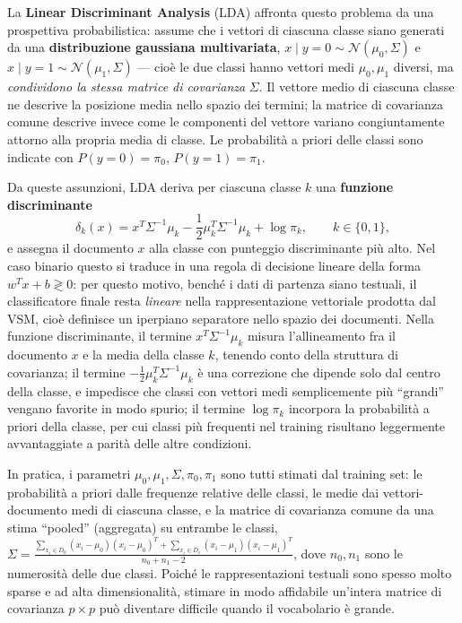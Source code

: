 \documentclass[11pt,a4paper]{report}
\begin{document}
La \textbf{Linear Discriminant Analysis} (LDA) affronta questo problema da una prospettiva probabilistica: assume che i vettori di ciascuna classe siano generati da una \textbf{distribuzione gaussiana multivariata}, $x \mid y{=}0 \sim \mathcal{N}(\mu_0,\Sigma)$ e $x \mid y{=}1 \sim \mathcal{N}(\mu_1,\Sigma)$ --- cioè le due classi hanno vettori medi $\mu_0,\mu_1$ diversi, ma \emph{condividono la stessa matrice di covarianza} $\Sigma$. Il vettore medio di ciascuna classe ne descrive la posizione media nello spazio dei termini; la matrice di covarianza comune descrive invece come le componenti del vettore variano congiuntamente attorno alla propria media di classe. Le probabilità a priori delle classi sono indicate con $P(y{=}0)=\pi_0$, $P(y{=}1)=\pi_1$.

Da queste assunzioni, LDA deriva per ciascuna classe $k$ una \textbf{funzione discriminante}
\[
\delta_k(x) = x^T \Sigma^{-1}\mu_k - \frac{1}{2}\mu_k^T\Sigma^{-1}\mu_k + \log \pi_k, \qquad k \in \{0,1\},
\]
e assegna il documento $x$ alla classe con punteggio discriminante più alto. Nel caso binario questo si traduce in una regola di decisione lineare della forma $w^Tx + b \gtrless 0$: per questo motivo, benché i dati di partenza siano testuali, il classificatore finale resta \emph{lineare} nella rappresentazione vettoriale prodotta dal VSM, cioè definisce un iperpiano separatore nello spazio dei documenti. Nella funzione discriminante, il termine $x^T\Sigma^{-1}\mu_k$ misura l'allineamento fra il documento $x$ e la media della classe $k$, tenendo conto della struttura di covarianza; il termine $-\frac{1}{2}\mu_k^T\Sigma^{-1}\mu_k$ è una correzione che dipende solo dal centro della classe, e impedisce che classi con vettori medi semplicemente più ``grandi'' vengano favorite in modo spurio; il termine $\log\pi_k$ incorpora la probabilità a priori della classe, per cui classi più frequenti nel training risultano leggermente avvantaggiate a parità delle altre condizioni.

In pratica, i parametri $\mu_0,\mu_1,\Sigma,\pi_0,\pi_1$ sono tutti stimati dal training set: le probabilità a priori dalle frequenze relative delle classi, le medie dai vettori-documento medi di ciascuna classe, e la matrice di covarianza comune da una stima ``pooled'' (aggregata) su entrambe le classi, $\Sigma = \frac{\sum_{x_i \in D_0}(x_i-\mu_0)(x_i-\mu_0)^T + \sum_{x_i \in D_1}(x_i-\mu_1)(x_i-\mu_1)^T}{n_0+n_1-2}$, dove $n_0,n_1$ sono le numerosità delle due classi. Poiché le rappresentazioni testuali sono spesso molto sparse e ad alta dimensionalità, stimare in modo affidabile un'intera matrice di covarianza $p \times p$ può diventare difficile quando il vocabolario è grande.
\end{document}
